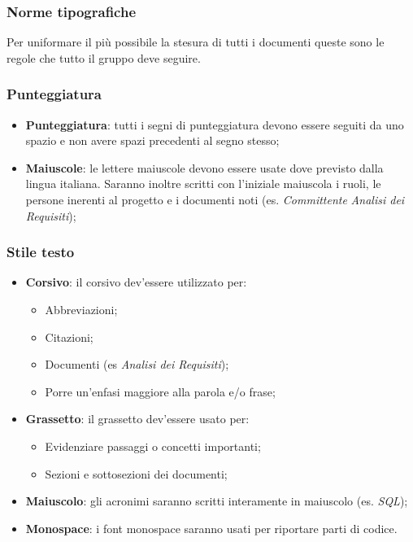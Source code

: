 \documentclass{scalatekids-article}
\begin{document}
\subsubsection{Norme tipografiche}
Per uniformare il più possibile la stesura di tutti i documenti queste sono le regole che tutto il gruppo deve seguire.

\subsubsection{Punteggiatura}
\begin{itemize}
\item \textbf{Punteggiatura}: tutti i segni di punteggiatura devono essere seguiti da uno spazio e non avere spazi precedenti al segno stesso;
\item \textbf{Maiuscole}: le lettere maiuscole devono essere usate dove previsto dalla lingua italiana.
  Saranno inoltre scritti con l'iniziale maiuscola i ruoli, le persone inerenti al progetto e i documenti noti (es. \textit{Committente} \textit{Analisi dei Requisiti});
\end{itemize}

\subsubsection{Stile testo}
\begin{itemize}
\item \textbf{Corsivo}: il corsivo dev'essere utilizzato per:
  \begin{itemize}
  \item Abbreviazioni;
  \item Citazioni;
  \item Documenti (es \textit{Analisi dei Requisiti});
  \item Porre un'enfasi maggiore alla parola e/o frase;
  \end{itemize}
\item \textbf{Grassetto}: il grassetto dev'essere usato per:
  \begin{itemize}
  \item Evidenziare passaggi o concetti importanti;
  \item Sezioni e sottosezioni dei documenti;
  \end{itemize}
\item \textbf{Maiuscolo}: gli acronimi saranno scritti interamente in maiuscolo (es. \textit{SQL});
\item \textbf{Monospace}: i font monospace saranno usati per riportare parti di codice.
\end{itemize}
\end{document}

